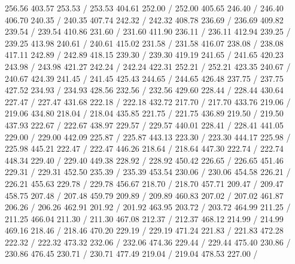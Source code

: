 { 256.56 403.57 253.53 /
 253.53 404.61 252.00 /
 252.00 405.65 246.40 /
 246.40 406.70 240.35 /
 240.35 407.74 242.32 /
 242.32 408.78 236.69 /
 236.69 409.82 239.54 /
 239.54 410.86 231.60 /
 231.60 411.90 236.11 /
 236.11 412.94 239.25 /
 239.25 413.98 240.61 /
 240.61 415.02 231.58 /
 231.58 416.07 238.08 /
 238.08 417.11 242.89 /
 242.89 418.15 239.30 /
 239.30 419.19 241.65 /
 241.65 420.23 243.98 /
 243.98 421.27 242.24 /
 242.24 422.31 252.21 /
 252.21 423.35 240.67 /
 240.67 424.39 241.45 /
 241.45 425.43 244.65 /
 244.65 426.48 237.75 /
 237.75 427.52 234.93 /
 234.93 428.56 232.56 /
 232.56 429.60 228.44 /
 228.44 430.64 227.47 /
 227.47 431.68 222.18 /
 222.18 432.72 217.70 /
 217.70 433.76 219.06 /
 219.06 434.80 218.04 /
 218.04 435.85 221.75 /
 221.75 436.89 219.50 /
 219.50 437.93 222.67 /
 222.67 438.97 229.57 /
 229.57 440.01 228.41 /
 228.41 441.05 229.00 /
 229.00 442.09 225.87 /
 225.87 443.13 223.30 /
 223.30 444.17 225.98 /
 225.98 445.21 222.47 /
 222.47 446.26 218.64 /
 218.64 447.30 222.74 /
 222.74 448.34 229.40 /
 229.40 449.38 228.92 /
 228.92 450.42 226.65 /
 226.65 451.46 229.31 /
 229.31 452.50 235.39 /
 235.39 453.54 230.06 /
 230.06 454.58 226.21 /
 226.21 455.63 229.78 /
 229.78 456.67 218.70 /
 218.70 457.71 209.47 /
 209.47 458.75 207.48 /
 207.48 459.79 209.89 /
 209.89 460.83 207.02 /
 207.02 461.87 206.26 /
 206.26 462.91 201.92 /
 201.92 463.95 203.72 /
 203.72 464.99 211.25 /
 211.25 466.04 211.30 /
 211.30 467.08 212.37 /
 212.37 468.12 214.99 /
 214.99 469.16 218.46 /
 218.46 470.20 229.19 /
 229.19 471.24 221.83 /
 221.83 472.28 222.32 /
 222.32 473.32 232.06 /
 232.06 474.36 229.44 /
 229.44 475.40 230.86 /
 230.86 476.45 230.71 /
 230.71 477.49 219.04 /
 219.04 478.53 227.00 /
}
